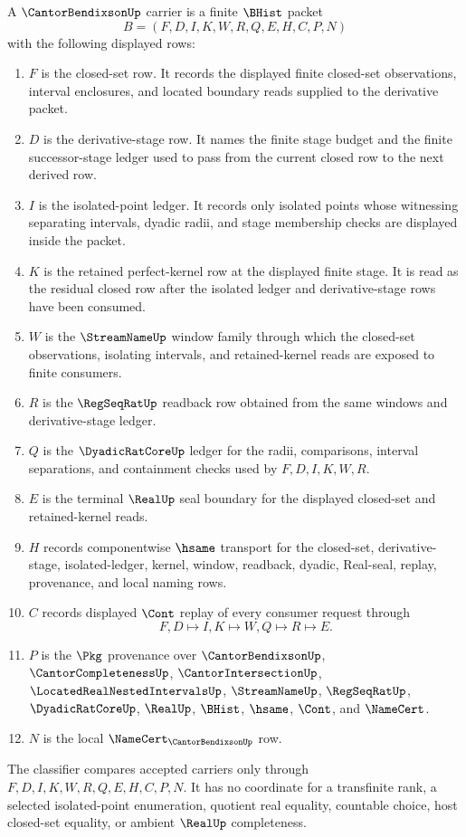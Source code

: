 \begin{definition}
\label{def:cantor-bendixson-carrier}
A $\CantorBendixsonUp$ carrier is a finite $\BHist$ packet
$$
B=(F,D,I,K,W,R,Q,E,H,C,P,N)
$$
with the following displayed rows:
\begin{enumerate}
\item $F$ is the closed-set row. It records the displayed finite closed-set observations, interval enclosures, and located boundary reads supplied to the derivative packet.
\item $D$ is the derivative-stage row. It names the finite stage budget and the finite successor-stage ledger used to pass from the current closed row to the next derived row.
\item $I$ is the isolated-point ledger. It records only isolated points whose witnessing separating intervals, dyadic radii, and stage membership checks are displayed inside the packet.
\item $K$ is the retained perfect-kernel row at the displayed finite stage. It is read as the residual closed row after the isolated ledger and derivative-stage rows have been consumed.
\item $W$ is the $\StreamNameUp$ window family through which the closed-set observations, isolating intervals, and retained-kernel reads are exposed to finite consumers.
\item $R$ is the $\RegSeqRatUp$ readback row obtained from the same windows and derivative-stage ledger.
\item $Q$ is the $\DyadicRatCoreUp$ ledger for the radii, comparisons, interval separations, and containment checks used by $F,D,I,K,W,R$.
\item $E$ is the terminal $\RealUp$ seal boundary for the displayed closed-set and retained-kernel reads.
\item $H$ records componentwise $\hsame$ transport for the closed-set, derivative-stage, isolated-ledger, kernel, window, readback, dyadic, Real-seal, replay, provenance, and local naming rows.
\item $C$ records displayed $\Cont$ replay of every consumer request through
$$
F,D\longmapsto I,K\longmapsto W,Q\longmapsto R\longmapsto E .
$$
\item $P$ is the $\Pkg$ provenance over $\CantorBendixsonUp$, $\CantorCompletenessUp$, $\CantorIntersectionUp$, $\LocatedRealNestedIntervalsUp$, $\StreamNameUp$, $\RegSeqRatUp$, $\DyadicRatCoreUp$, $\RealUp$, $\BHist$, $\hsame$, $\Cont$, and $\NameCert$.
\item $N$ is the local $\NameCert_{\CantorBendixsonUp}$ row.
\end{enumerate}
The classifier compares accepted carriers only through $F,D,I,K,W,R,Q,E,H,C,P,N$. It has no coordinate for a transfinite rank, a selected isolated-point enumeration, quotient real equality, countable choice, host closed-set equality, or ambient $\RealUp$ completeness.
\end{definition}

